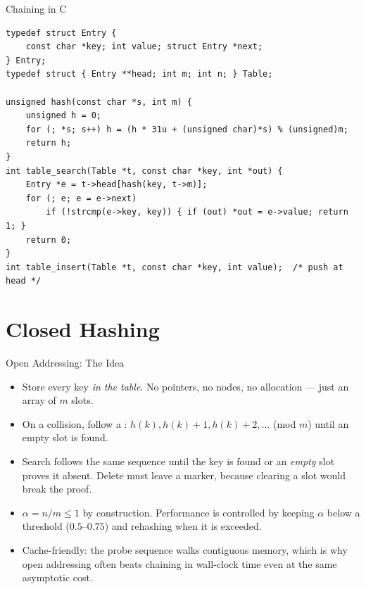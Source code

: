 \documentclass[aspectratio=169]{beamer}
\begin{document}
\begin{frame}[fragile]{Chaining in C}
  \scriptsize
\begin{verbatim}
typedef struct Entry {
    const char *key; int value; struct Entry *next;
} Entry;
typedef struct { Entry **head; int m; int n; } Table;

unsigned hash(const char *s, int m) {
    unsigned h = 0;
    for (; *s; s++) h = (h * 31u + (unsigned char)*s) % (unsigned)m;
    return h;
}
int table_search(Table *t, const char *key, int *out) {
    Entry *e = t->head[hash(key, t->m)];
    for (; e; e = e->next)
        if (!strcmp(e->key, key)) { if (out) *out = e->value; return 1; }
    return 0;
}
int table_insert(Table *t, const char *key, int value);  /* push at head */
\end{verbatim}
  \vspace{-0.1cm}
  \footnotesize
\end{frame}


\section{Closed Hashing}


\begin{frame}{Open Addressing: The Idea}
  \begin{itemize}
    \item Store every key \emph{in the table}. No pointers, no nodes, no
      allocation --- just an array of $m$ slots.
    \item On a collision, follow a :
      $h(k), h(k)+1, h(k)+2, \dots$ (mod $m$) until an empty slot is found.
    \item Search follows the same sequence until the key is found or an
      \emph{empty} slot proves it absent. Delete must leave a marker, because
      clearing a slot would break the proof.
    \item $\alpha = n/m \le 1$ by construction. Performance is controlled by
      keeping $\alpha$ below a threshold ($0.5$--$0.75$) and rehashing when
      it is exceeded.
    \item Cache-friendly: the probe sequence walks contiguous memory, which
      is why open addressing often beats chaining in wall-clock time even at
      the same asymptotic cost.
  \end{itemize}
\end{frame}
\end{document}

